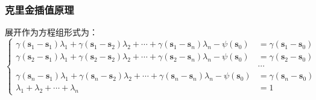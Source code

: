 \documentclass{beamer}
\begin{document}
\begin{frame}
    \frametitle{克里金插值原理}
    展开作为方程组形式为：
    \begin{equation}
        \left\{
        \begin{aligned}
            \gamma \left( \mathbf{s}_{1} - \mathbf{s}_{1} \right) \lambda_{1}+ \gamma \left( \mathbf{s}_{1} - \mathbf{s}_{2} \right) \lambda_{2}+\cdots + \gamma \left( \mathbf{s}_{1} - \mathbf{s}_{n} \right) \lambda_{n}-\psi\left( \mathbf{s}_{0} \right)    & = \gamma \left( \mathbf{s}_{1} - \mathbf{s}_{0} \right) \\
            \gamma \left( \mathbf{s}_{2} - \mathbf{s}_{1} \right) \lambda_{1} + \gamma \left( \mathbf{s}_{2} - \mathbf{s}_{2} \right) \lambda_{2} + \cdots + \gamma \left( \mathbf{s}_{2} - \mathbf{s}_{n} \right) \lambda_{n}-\psi\left( \mathbf{s}_{0} \right) & = \gamma \left( \mathbf{s}_{2} - \mathbf{s}_{0} \right) \\                                                                & \cdots                                                  \\
            \gamma \left( \mathbf{s}_{n} - \mathbf{s}_{1} \right) \lambda_{1}+\gamma \left( \mathbf{s}_{n} - \mathbf{s}_{2} \right) \lambda_{2}+\cdots+\gamma \left( \mathbf{s}_{n} - \mathbf{s}_{n} \right)\lambda_{n}-\psi\left( \mathbf{s}_{0} \right)        & = \gamma \left( \mathbf{s}_{n} - \mathbf{s}_{0} \right) \\
            \lambda_{1}+\lambda_{2}+\cdots+\lambda_{n}                                                                                                                                                                                                           & =1
        \end{aligned}
        \right.
        \label{克里金方程线性方程组}
    \end{equation}
\end{frame}
\end{document}

